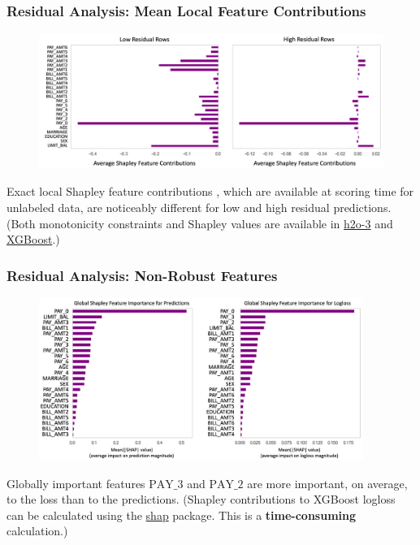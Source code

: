 \documentclass[11pt,
               aspectratio=169,
               hyperref={colorlinks}
               ]{beamer}
\begin{document}
			\begin{frame}[t]
		
				\frametitle{\textbf{Residual Analysis}: Mean Local Feature Contributions}
				\vspace{-15pt}
				\begin{figure}
					\begin{center}
						\includegraphics[height=125pt]{../img/global_high_low.png}
					\end{center}
				\end{figure}	
				\scriptsize{Exact local Shapley feature contributions \cite{shapley}, which are available at scoring time for unlabeled data, are noticeably different for low and high residual predictions. (Both monotonicity constraints and Shapley values are available in \href{https://www.github.com/h2oai/h2o-3}{h2o-3} and \href{https://www.github.com/dmlc/xgboost}{XGBoost}.)} 
		
			\end{frame}

			\begin{frame}[t]
		
				\frametitle{\large{\textbf{Residual Analysis}: Non-Robust Features}}
				\vspace{-10pt}
				\begin{figure}
					\begin{center}
						\includegraphics[height=150pt]{../img/global_pred_loss.png}
					\end{center}
				\end{figure}
				\vspace{-8pt}	
				\scriptsize{Globally important features $\text{PAY\_3}$ and $\text{PAY\_2}$ are more important, on average, to the loss than to the predictions. (Shapley contributions to XGBoost logloss can be calculated using the \href{https://github.com/slundberg/shap}{shap} package. This is a \textbf{time-consuming} calculation.)} 
		
			\end{frame}
\end{document}
